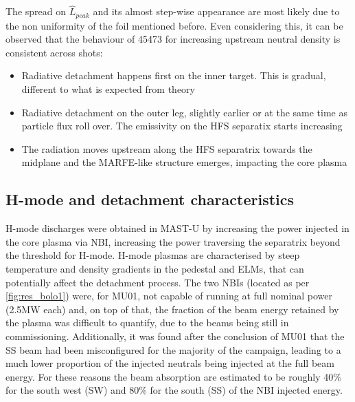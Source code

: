 The spread on ${\hat{L}}_{peak}$ and its almost step-wise appearance are most likely due to the non uniformity of the foil mentioned before. Even considering this, it can be observed that the behaviour of 45473 for increasing upstream neutral density is consistent across shots:
\begin{itemize}
    \item Radiative detachment happens first on the inner target. This is gradual, different to what is expected from theory\cite{Lipschultz2016}
    \item Radiative detachment on the outer leg, slightly earlier or at the same time as particle flux roll over. The emissivity on the HFS separatix starts increasing
    \item The radiation moves upstream along the HFS separatrix towards the midplane and the MARFE-like structure emerges, impacting the core plasma
\end{itemize}

\subsection{H-mode and detachment characteristics}

H-mode discharges were obtained in MAST-U by increasing the power injected in the core plasma via NBI, increasing the power traversing the separatrix beyond the threshold for H-mode. H-mode plasmas are characterised by steep temperature and density gradients in the pedestal and ELMs, that can potentially affect the detachment process.
The two NBIs (located as per \autoref{fig:res_bolo1}) were, for MU01, not capable of running at full nominal power (2.5MW each) and, on top of that, the fraction of the beam energy retained by the plasma was difficult to quantify, due to the beams being still in commissioning. %
Additionally, it was found after the conclusion of MU01 that the SS beam had been misconfigured for the majority of the campaign, leading to a much lower proportion of the injected neutrals being injected at the full beam energy. For these reasons the beam absorption are estimated to be roughly 40\% for the south west (SW) and 80\% for the south (SS) of the NBI injected energy.

